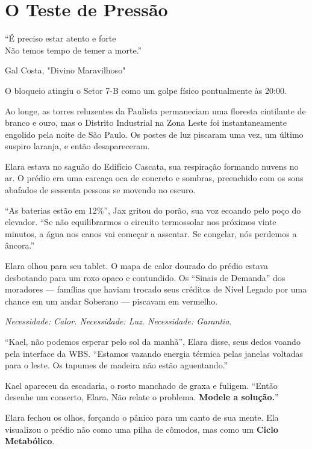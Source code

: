 
\chapter{O Teste de Pressão}
\epigraph{``É preciso estar atento e forte \\ Não temos tempo de temer a morte.''}{Gal Costa, "Divino Maravilhoso"}

O bloqueio atingiu o Setor 7-B como um golpe físico pontualmente às 20:00.

Ao longe, as torres reluzentes da Paulista permaneciam uma floresta cintilante de branco e ouro, mas o Distrito Industrial na Zona Leste foi instantaneamente engolido pela noite de São Paulo. Os postes de luz piscaram uma vez, um último suspiro laranja, e então desapareceram.

Elara estava no saguão do Edifício Cascata, sua respiração formando nuvens no ar. O prédio era uma carcaça oca de concreto e sombras, preenchido com os sons abafados de sessenta pessoas se movendo no escuro.


``As baterias estão em 12\%'', Jax gritou do porão, sua voz ecoando pelo poço do elevador. ``Se não equilibrarmos o circuito termossolar nos próximos vinte minutos, a água nos canos vai começar a assentar. Se congelar, nós perdemos a âncora.''

Elara olhou para seu tablet. O mapa de calor dourado do prédio estava desbotando para um roxo opaco e contundido. Os ``Sinais de Demanda'' dos moradores --- famílias que haviam trocado seus créditos de Nível Legado por uma chance em um andar Soberano --- piscavam em vermelho.

\textit{Necessidade: Calor. Necessidade: Luz. Necessidade: Garantia.}

``Kael, não podemos esperar pelo sol da manhã'', Elara disse, seus dedos voando pela interface da WBS. ``Estamos vazando energia térmica pelas janelas voltadas para o leste. Os tapumes de madeira não estão aguentando.''

Kael apareceu da escadaria, o rosto manchado de graxa e fuligem. ``Então desenhe um conserto, Elara. Não relate o problema. \textbf{Modele a solução.}''

Elara fechou os olhos, forçando o pânico para um canto de sua mente. Ela visualizou o prédio não como uma pilha de cômodos, mas como um \textbf{Ciclo Metabólico}.

